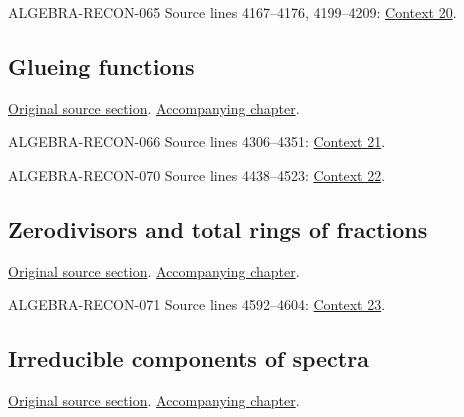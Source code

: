 \begin{AlgebraSourceRoutes}
\item[ALGEBRA-RECON-065] Source lines 4167--4176, 4199--4209: \hyperlink{algebra-context-020}{Context 20}.
\end{AlgebraSourceRoutes}

\subsection{Glueing functions}
\hypertarget{algebra-source-section-tilde-module-sheaf}{}
\noindent\href{https://github.com/stacks/stacks-project/blob/a04446e57ec1fbc252a871afcec7752fb2807b14/algebra.tex\#L4284}{Original source section}. \href{algebra.pdf\#nameddest=section-tilde-module-sheaf}{Accompanying chapter}.

\begin{AlgebraSourceRoutes}
\item[ALGEBRA-RECON-066] Source lines 4306--4351: \hyperlink{algebra-context-021}{Context 21}.
\item[ALGEBRA-RECON-070] Source lines 4438--4523: \hyperlink{algebra-context-022}{Context 22}.
\end{AlgebraSourceRoutes}

\subsection{Zerodivisors and total rings of fractions}
\hypertarget{algebra-source-section-total-quotient-ring}{}
\noindent\href{https://github.com/stacks/stacks-project/blob/a04446e57ec1fbc252a871afcec7752fb2807b14/algebra.tex\#L4536}{Original source section}. \href{algebra.pdf\#nameddest=section-total-quotient-ring}{Accompanying chapter}.

\begin{AlgebraSourceRoutes}
\item[ALGEBRA-RECON-071] Source lines 4592--4604: \hyperlink{algebra-context-023}{Context 23}.
\end{AlgebraSourceRoutes}

\subsection{Irreducible components of spectra}
\hypertarget{algebra-source-section-irreducible}{}
\noindent\href{https://github.com/stacks/stacks-project/blob/a04446e57ec1fbc252a871afcec7752fb2807b14/algebra.tex\#L4656}{Original source section}. \href{algebra.pdf\#nameddest=section-irreducible}{Accompanying chapter}.

